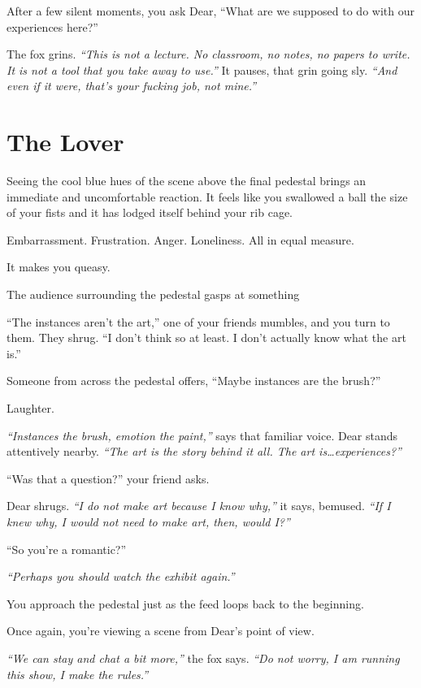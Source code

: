 After a few silent moments, you ask Dear, ``What are we supposed to do with our experiences here?''

The fox grins. \emph{``This is not a lecture. No classroom, no notes, no papers to write. It is not a tool that you take away to use.''} It pauses, that grin going sly. \emph{``And even if it were, that's your fucking job, not mine.''}

\newpage

\section*{The Lover}

Seeing the cool blue hues of the scene above the final pedestal brings an immediate and uncomfortable reaction. It feels like you swallowed a ball the size of your fists and it has lodged itself behind your rib cage.

Embarrassment. Frustration. Anger. Loneliness. All in equal measure.

It makes you queasy.

The audience surrounding the pedestal gasps at something

``The instances aren't the art,'' one of your friends mumbles, and you turn to them. They shrug. ``I don't think so at least. I don't actually know what the art is.''

Someone from across the pedestal offers, ``Maybe instances are the brush?''

Laughter.

\emph{``Instances the brush, emotion the paint,''} says that familiar voice. Dear stands attentively nearby. \emph{``The art is the story behind it all. The art is\ldots{}experiences?''}

``Was that a question?'' your friend asks.

Dear shrugs. \emph{``I do not make art because I know why,''} it says, bemused. \emph{``If I knew why, I would not need to make art, then, would I?''}

``So you're a romantic?''

\emph{``Perhaps you should watch the exhibit again.''}

You approach the pedestal just as the feed loops back to the beginning.

Once again, you're viewing a scene from Dear's point of view.

\emph{``We can stay and chat a bit more,''} the fox says. \emph{``Do not worry, I am running this show, I make the rules.''}

